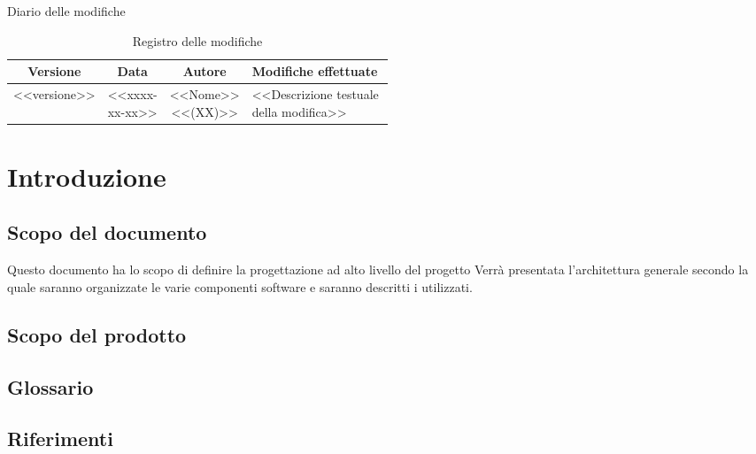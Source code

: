 
\newpage
Diario delle modifiche
\begin{center}
\begin{longtable}{|c|c|c|p{0.5\linewidth}|}
\toprule
\textbf{Versione} & \textbf{Data} & \textbf{Autore} & \textbf{Modifiche effettuate}\\

\midrule
<<versione>> & <<xxxx-xx-xx>> & <<Nome>> <<(XX)>> & <<Descrizione testuale della modifica>>


\bottomrule
\caption{Registro delle modifiche}
\label{tab:changelog}
\end{longtable}
\end{center}

\newpage
\tableofcontents


\newpage
\section{Introduzione}
\label{1.0}
\subsection{Scopo del documento}
\label{1.1}
Questo documento ha lo scopo di deﬁnire la progettazione ad alto livello del progetto \textbf{\Progetto{}}
Verrà presentata l’architettura generale secondo la quale saranno organizzate le varie 
componenti software e saranno descritti i  utilizzati.

\subsection{Scopo del prodotto}
\label{1.2}
\Prodotto{}

\subsection{Glossario}%
\label{1.3}
\Glossario{}

\subsection{Riferimenti}
\label{1.4}

